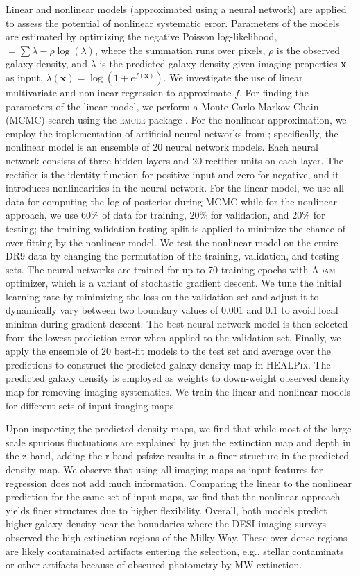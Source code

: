 Linear and nonlinear models (approximated using a neural network) are applied to assess the potential of nonlinear systematic error. Parameters of the models are estimated by optimizing the negative Poisson log-likelihood, $= \sum \lambda - \rho \log(\lambda)$, where the summation runs over pixels, $\rho$ is the observed galaxy density, and $\lambda$ is the predicted galaxy density given imaging properties \textbf{x} as input, $\lambda(\textbf{x}) = \log (1+e^{f(\textbf{x})})$. We investigate the use of linear multivariate and nonlinear regression to approximate $f$. For finding the parameters of the linear model, we perform a Monte Carlo Markov Chain (MCMC) search using the \textsc{emcee} package \citep{2013PASP..125..306F}. For the nonlinear approximation, we employ the implementation of artificial neural networks from \cite{rezaie2021primordial}; specifically, the nonlinear model is an ensemble of 20 neural network models. Each neural network consists of three hidden layers and 20 rectifier units on each layer. The rectifier is the identity function for positive input and zero for negative, and it introduces nonlinearities in the neural network. For the linear model, we use all data for computing the log of posterior during MCMC while for the nonlinear approach, we use $60\%$ of data for training, $20\%$ for validation, and $20\%$ for testing; the training-validation-testing split is applied to minimize the chance of over-fitting by the nonlinear model. We test the nonlinear model on the entire DR9 data by changing the permutation of the training, validation, and testing sets. The neural networks are trained for up to 70 training epochs with \textsc{Adam} optimizer, which is a variant of stochastic gradient descent. We tune the initial learning rate by minimizing the loss on the validation set and adjust it to dynamically vary between two boundary values of $0.001$ and $0.1$ to avoid local minima during gradient descent. The best neural network model is then selected from the lowest prediction error when applied to the validation set. Finally, we apply the ensemble of 20 best-fit models to the test set and average over the predictions to construct the predicted galaxy density map in \textsc{HEALPix}. The predicted galaxy density is employed as weights to down-weight observed density map for removing imaging systematics. We train the linear and nonlinear models for different sets of input imaging maps. 

Upon inspecting the predicted density maps, we find that while most of the large-scale spurious fluctuations are explained by just the extinction map and depth in the z band, adding the r-band psfsize results in a finer structure in the predicted density map. We observe that using all imaging maps as input features for regression does not add much information. Comparing the linear to the nonlinear prediction for the same set of input maps, we find that the nonlinear approach yields finer structures due to higher flexibility. Overall, both models predict higher galaxy density near the boundaries where the DESI imaging surveys observed the high extinction regions of the Milky Way. These over-dense regions are likely contaminated artifacts entering the selection, e.g., stellar contaminats or other artifacts because of obscured photometry by MW extinction.

